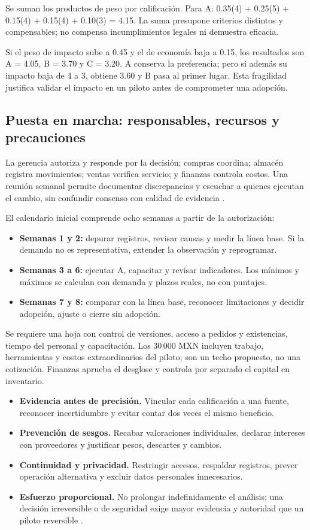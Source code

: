 \documentclass[12pt,spanish,letterpaper,oneside]{article}
\begin{document}
Se suman los productos de peso por calificación. Para A:
0.35(4) + 0.25(5) + 0.15(4) + 0.15(4) + 0.10(3) = 4.15.
La suma presupone criterios distintos y compensables; no compensa
incumplimientos legales ni demuestra eficacia.

Si el peso de impacto sube a 0.45 y el de economía baja a 0.15, los resultados
son A = 4.05, B = 3.70 y C = 3.20. A conserva la preferencia; pero si además
su impacto baja de 4 a 3, obtiene 3.60 y B pasa al primer lugar. Esta fragilidad
justifica validar el impacto en un piloto antes de comprometer una adopción.

\clearpage
\subsection{Puesta en marcha: responsables, recursos y precauciones}
La gerencia autoriza y responde por la decisión; compras coordina; almacén
registra movimientos; ventas verifica servicio; y finanzas controla costos.
Una reunión semanal permite documentar discrepancias y escuchar a quienes
ejecutan el cambio, sin confundir consenso con calidad de evidencia \citep{soto2020}.

El calendario inicial comprende ocho semanas a partir de la autorización:
\begin{itemize}
\item \textbf{Semanas 1 y 2:} depurar registros, revisar causas y medir la
línea base. Si la demanda no es representativa, extender la observación y reprogramar.
\item \textbf{Semanas 3 a 6:} ejecutar A, capacitar y revisar indicadores.
Los mínimos y máximos se calculan con demanda y plazos reales, no con puntajes.
\item \textbf{Semanas 7 y 8:} comparar con la línea base, reconocer limitaciones
y decidir adopción, ajuste o cierre sin adopción.
\end{itemize}

Se requiere una hoja con control de versiones, acceso a pedidos y existencias,
tiempo del personal y capacitación. Los 30\,000 MXN incluyen trabajo, herramientas
y costos extraordinarios del piloto; son un techo propuesto, no una cotización.
Finanzas aprueba el desglose y controla por separado el capital en inventario.

\begin{itemize}
\item \textbf{Evidencia antes de precisión.} Vincular cada calificación a una
fuente, reconocer incertidumbre y evitar contar dos veces el mismo beneficio.
\item \textbf{Prevención de sesgos.} Recabar valoraciones individuales,
declarar intereses con proveedores y justificar pesos, descartes y cambios.
\item \textbf{Continuidad y privacidad.} Restringir accesos, respaldar registros,
prever operación alternativa y excluir datos personales innecesarios.
\item \textbf{Esfuerzo proporcional.} No prolongar indefinidamente el análisis;
una decisión irreversible o de seguridad exige mayor evidencia y autoridad
que un piloto reversible \citep{solano2003}.
\end{itemize}
\end{document}
